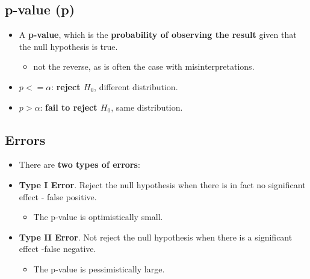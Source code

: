 \documentclass[10pt,article]{article}
\begin{document}
\subsection{p-value (p)}
\label{sec:org478064e}
\begin{itemize}
\item A \textbf{p-value}, which is the \textbf{probability of observing the result} given that the {\color{green}null hypothesis is true}.
\begin{itemize}
\item {\color{blue}not the reverse, as is often the case with misinterpretations}.
\end{itemize}
\item \(p <= \alpha\): \textbf{reject \(H_0\)}, different distribution.
\item \(p > \alpha\): \textbf{fail to reject \(H_0\)}, same distribution.
\end{itemize}

\subsection{Errors}
\label{sec:org20861b6}
\begin{itemize}
\item There are \textbf{two types of errors}:
\item \textbf{Type I Error}. {\color{green}Reject the null hypothesis when there is in fact no significant effect} {\color{yellow}- false positive}.
\begin{itemize}
\item The p-value is optimistically small.
\end{itemize}
\item \textbf{Type II Error}. {\color{green}Not reject the null hypothesis when there is a significant effect} {\color{yellow}-false negative}.
\begin{itemize}
\item The p-value is pessimistically large.
\end{itemize}
\end{itemize}
\end{document}
